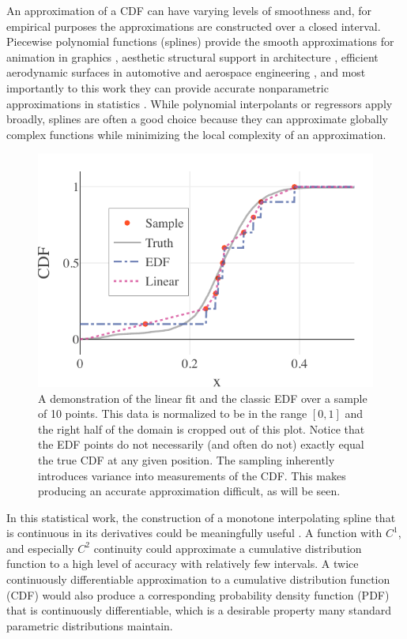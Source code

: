 \documentclass[letterpaper, 10 pt, conference]{ieeeconf}  %
\begin{document}
An approximation of a CDF can have varying levels of smoothness and, for empirical purposes the approximations are constructed over a closed interval. Piecewise polynomial functions (splines) provide the smooth approximations for animation in graphics \cite{herman2015techniques,quint2003scalable}, aesthetic structural support in architecture \cite{brennan2019measure}, efficient aerodynamic surfaces in automotive and aerospace engineering \cite{brennan2019measure}, and most importantly to this work they can provide accurate nonparametric approximations in statistics \cite{knott2012interpolating}. While polynomial interpolants or regressors apply broadly, splines are often a good choice because they can approximate globally complex functions while minimizing the local complexity of an approximation.

\begin{figure}
  \vspace{-.3cm}
  \includegraphics[width=.5\textwidth]{fl-sample-prediction.pdf}
  \caption{A demonstration of the linear fit and the classic EDF over a sample of 10 points. This data is normalized to be in the range $[0,1]$ and the right half of the domain is cropped out of this plot. Notice that the EDF points do not necessarily (and often do not) exactly equal the true CDF at any given position. The sampling inherently introduces variance into measurements of the CDF. This makes producing an accurate approximation difficult, as will be seen.
  \vspace{-.5cm}}
  \label{fig:sample-prediction}
\end{figure}

In this statistical work, the construction of a monotone interpolating spline that is continuous in its derivatives could be meaningfully useful \cite{ramsay1988monotone}. A function with $C^1$, and especially $C^2$ continuity could approximate a cumulative distribution function to a high level of accuracy with relatively few intervals. A twice continuously differentiable approximation to a cumulative distribution function (CDF) would also produce a corresponding probability density function (PDF) that is continuously differentiable, which is a desirable property many standard parametric distributions maintain.
\end{document}
